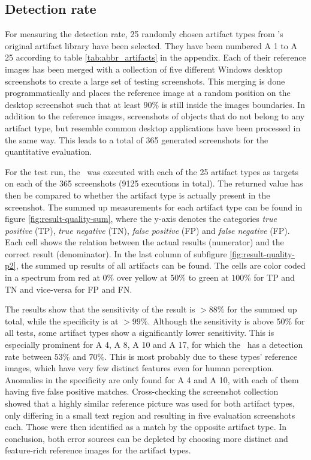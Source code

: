 \subsection{Detection rate}\label{sec:eval-results:subsec:dect}

For measuring the detection rate, 25 randomly chosen artifact types from \ape's original artifact library have been selected. They have been numbered A 1 to A 25 according to table \ref{tab:abbr_artifacts} in the appendix. Each of their reference images has been merged with a collection of five different Windows desktop screenshots to create a large set of testing screenshots. This merging is done programmatically and places the reference image at a random position on the desktop screenshot such that at least $90\%$ is still inside the images boundaries. In addition to the reference images, screenshots of objects that do not belong to any artifact type, but resemble common desktop applications have been processed in the same way. This leads to a total of 365 generated screenshots for the quantitative evaluation.

For the test run, the \vd~was executed with each of the 25 artifact types as targets on each of the 365 screenshots (9125 executions in total). The returned value has then be compared to whether the artifact type is actually present in the screenshot. The summed up measurements for each artifact type can be found in figure \ref{fig:result-quality-sum}, where the y-axis denotes the categories \emph{true positive} (TP), \emph{true negative} (TN), \emph{false positive} (FP) and \emph{false negative} (FP). Each cell shows the relation between the actual results (numerator) and the correct result (denominator). In the last column of subfigure \ref{fig:result-quality-p2}, the summed up results of all artifacts can be found. The cells are color coded in a spectrum from red at $0\%$ over yellow at $50\%$ to green at $100\%$ for TP and TN and vice-versa for FP and FN.

The results show that the sensitivity of the result is $>88\%$ for the summed up total, while the specificity is at $>99\%$. Although the sensitivity is above $50\%$ for all tests, some artifact types show a significantly lower sensitivity. This is especially prominent for A 4, A 8, A 10 and A 17, for which the \vd~has a detection rate between $53\%$ and $70\%$. This is most probably due to these types' reference images, which have very few distinct features even for human perception. Anomalies in the specificity are only found for A 4 and A 10, with each of them having five false positive matches. Cross-checking the screenshot collection showed that a highly similar reference picture was used for both artifact types, only differing in a small text region and resulting in five evaluation screenshots each. Those were then identified as a match by the opposite artifact type. In conclusion, both error sources can be depleted by choosing more distinct and feature-rich reference images for the artifact types.

